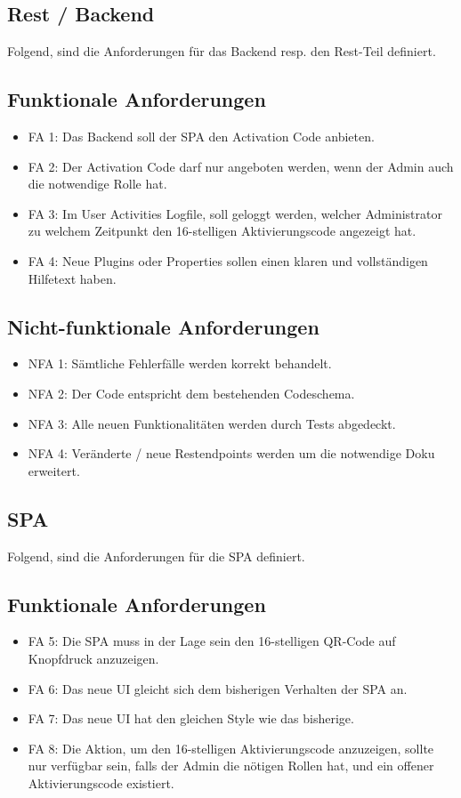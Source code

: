 \subsection{Rest / Backend} \label{subsec:anforderungenBackend}

Folgend, sind die Anforderungen für das Backend resp. den Rest-Teil definiert.

\subsection*{Funktionale Anforderungen}
\begin{itemize}
	\item FA 1: Das Backend soll der SPA den Activation Code anbieten.
	\item FA 2: Der Activation Code darf nur angeboten werden, wenn der Admin auch die notwendige Rolle hat.
	\item FA 3: Im User Activities Logfile, soll geloggt werden, welcher Administrator zu welchem Zeitpunkt den 16-stelligen Aktivierungscode angezeigt hat.
	\item FA 4: Neue Plugins oder Properties sollen einen klaren und vollständigen Hilfetext haben.
\end{itemize}

\subsection*{Nicht-funktionale Anforderungen}
\begin{itemize}
	\item NFA 1: Sämtliche Fehlerfälle werden korrekt behandelt.
	\item NFA 2: Der Code entspricht dem bestehenden Codeschema.
	\item NFA 3: Alle neuen Funktionalitäten werden durch Tests abgedeckt.
	\item NFA 4: Veränderte / neue Restendpoints werden um die notwendige Doku erweitert.
\end{itemize}

\subsection{SPA} \label{subsec:anforderungenSPA}

Folgend, sind die Anforderungen für die SPA definiert.

\subsection*{Funktionale Anforderungen}
\begin{itemize}
	\item FA 5: Die SPA muss in der Lage sein den 16-stelligen QR-Code auf Knopfdruck anzuzeigen.
	\item FA 6: Das neue UI gleicht sich dem bisherigen Verhalten der SPA an.
	\item FA 7: Das neue UI hat den gleichen Style wie das bisherige.
	\item FA 8: Die Aktion, um den 16-stelligen Aktivierungscode anzuzeigen, sollte nur verfügbar sein, falls der Admin die nötigen Rollen hat, und ein offener Aktivierungscode existiert.
\end{itemize}

